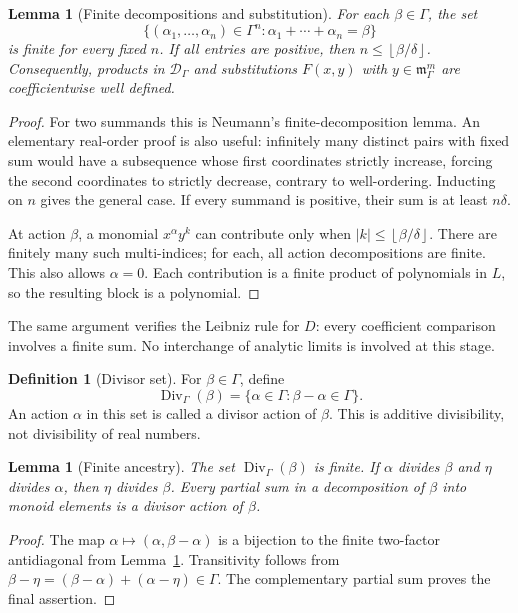 \documentclass[11pt,a4paper]{article}
\numberwithin{equation}{section}
\newtheorem{lemma}[theorem]{Lemma}
\theoremstyle{definition}
\newtheorem{definition}[theorem]{Definition}
\theoremstyle{remark}
\newcommand{\G}{\Gamma}
\newcommand{\Div}{\operatorname{Div}}
\newcommand{\floor}[1]{\left\lfloor #1\right\rfloor}
\begin{document}
\begin{lemma}[Finite decompositions and substitution]\label{lem:finite}
For each \(\beta\in\G\), the set
\[
 \{(\alpha_1,\ldots,\alpha_n)\in\G^n:
               \alpha_1+\cdots+\alpha_n=\beta\}
\]
is finite for every fixed \(n\). If all entries are positive, then
\(n\le\floor{\beta/\delta}\).
Consequently, products in \(\mathscr D_\G\) and substitutions
\(F(x,y)\) with \(y\in\mathfrak m_\G^m\) are coefficientwise well defined.
\end{lemma}
\begin{proof}
For two summands this is Neumann's finite-decomposition lemma. An
elementary real-order proof is also useful: infinitely many distinct
pairs with fixed sum would have a subsequence whose first coordinates
strictly increase, forcing the second coordinates to strictly decrease,
contrary to well-ordering. Inducting on \(n\) gives the general case.
If every summand is positive, their sum is at least \(n\delta\).

At action \(\beta\), a monomial \(x^\alpha y^k\) can contribute only
when \(|k|\le\floor{\beta/\delta}\). There are finitely many such
multi-indices; for each, all action decompositions are finite. This also
allows \(\alpha=0\). Each contribution is a finite product of
polynomials in \(L\), so the resulting block is a polynomial.
\end{proof}

The same argument verifies the Leibniz rule for \(D\): every coefficient
comparison involves a finite sum. No interchange of analytic limits is
involved at this stage.

\begin{definition}[Divisor set]\label{def:divisor}
For \(\beta\in\G\), define
\begin{equation}\label{eq:divisor}
 \Div_\G(\beta)=\{\alpha\in\G:\beta-\alpha\in\G\}.
\end{equation}
An action \(\alpha\) in this set is called a divisor action of \(\beta\).
This is additive divisibility, not divisibility of real numbers.
\end{definition}

\begin{lemma}[Finite ancestry]\label{lem:divisor}
The set \(\Div_\G(\beta)\) is finite. If \(\alpha\) divides \(\beta\)
and \(\eta\) divides \(\alpha\), then \(\eta\) divides \(\beta\).
Every partial sum in a decomposition of \(\beta\) into monoid elements
is a divisor action of \(\beta\).
\end{lemma}
\begin{proof}
The map \(\alpha\mapsto(\alpha,\beta-\alpha)\) is a bijection to the
finite two-factor antidiagonal from Lemma~\ref{lem:finite}. Transitivity
follows from
\(\beta-\eta=(\beta-\alpha)+(\alpha-\eta)\in\G\).
The complementary partial sum proves the final assertion.
\end{proof}
\end{document}
